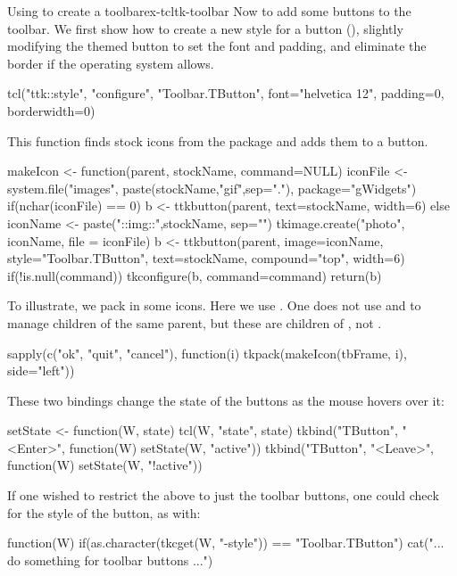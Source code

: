 \begin{example}{Using  to create a toolbar}{ex-tcltk-toolbar}
Now to add some buttons to the toolbar. We first show how to create a
new style for a button (), slightly modifying the themed button to set
the font and padding, and eliminate the border if the operating system allows. 
\begin{Schunk}
\begin{Sinput}
 tcl("ttk::style", "configure", "Toolbar.TButton", 
     font="helvetica 12", padding=0, borderwidth=0)
\end{Sinput}
\end{Schunk}
%
This  function finds stock icons from the
 package and adds them to a button.
\begin{Schunk}
\begin{Sinput}
 makeIcon <- function(parent, stockName, command=NULL) {
   iconFile <- system.file("images", 
                           paste(stockName,"gif",sep="."), 
                           package="gWidgets")
   if(nchar(iconFile) == 0) {
     b <- ttkbutton(parent, text=stockName, width=6)
   } else {
     iconName <- paste("::img::",stockName, sep="")
     tkimage.create("photo", iconName, file = iconFile)
     b <- ttkbutton(parent, image=iconName, 
                    style="Toolbar.TButton", text=stockName, 
                    compound="top", width=6)
     if(!is.null(command))
       tkconfigure(b, command=command)
   }
   return(b)
 }
\end{Sinput}
\end{Schunk}
%
To illustrate, we pack in some icons. Here we use .  
One does not use  and  to manage
children of the same parent, but these are children of ,
not .
\begin{Schunk}
\begin{Sinput}
 sapply(c("ok", "quit", "cancel"), function(i)
        tkpack(makeIcon(tbFrame, i), side="left"))
\end{Sinput}
\end{Schunk}

These two bindings change the state of the buttons as the mouse hovers
over it:

\begin{Schunk}
\begin{Sinput}
 setState <- function(W, state) tcl(W, "state", state)
 tkbind("TButton", "<Enter>", function(W) setState(W, "active"))
 tkbind("TButton", "<Leave>", function(W) setState(W, "!active"))
\end{Sinput}
\end{Schunk}

If one wished to restrict the above to just the toolbar buttons, one
could check for the style of the button, as with:

\begin{Schunk}
\begin{Sinput}
 function(W) {
   if(as.character(tkcget(W, "-style")) == "Toolbar.TButton")
     cat("... do something for toolbar buttons ...")
 }
\end{Sinput}
\end{Schunk}
\end{example}


